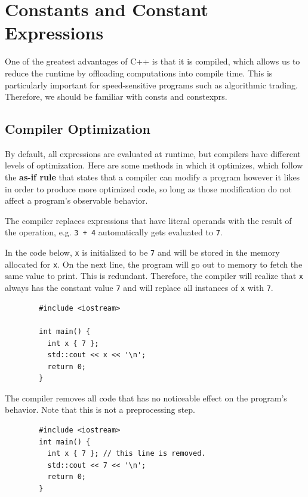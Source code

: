 \documentclass{article}
\newcounter{definition}[section]
\newcounter{algo}[section]
\newcounter{code}[section]
\begin{document}
\section{Constants and Constant Expressions}

    One of the greatest advantages of C++ is that it is compiled, which allows us to reduce the runtime by offloading computations into compile time. This is particularly important for speed-sensitive programs such as algorithmic trading. Therefore, we should be familiar with consts and constexprs. 

  \subsection{Compiler Optimization} 

    By default, all expressions are evaluated at runtime, but compilers have different levels of optimization. Here are some methods in which it optimizes, which follow the \textbf{as-if rule} that states that a compiler can modify a program however it likes in order to produce more optimized code, so long as those modification do not affect a program's observable behavior. 

    \begin{definition}
      \label{def:constant-folding}
 
      The compiler replaces expressions that have literal operands with the result of the operation, e.g. \texttt{3 + 4} automatically gets evaluated to \texttt{7}. 
    \end{definition}

    \begin{definition}
      \label{def:constant-propagation}
      In the code below, \texttt{x} is initialized to be \texttt{7} and will be stored in the memory allocated for \texttt{x}. On the next line, the program will go out to memory to fetch the same value to print. This is redundant. Therefore, the compiler will realize that \texttt{x} always has the constant value \texttt{7} and will replace all instances of \texttt{x} with \texttt{7}. 
      \begin{lstlisting}
        #include <iostream>

        int main() {
          int x { 7 };
          std::cout << x << '\n';
          return 0;
        } 
      \end{lstlisting}
    \end{definition}

    \begin{definition}
      \label{def:dead-code-elimination}
      The compiler removes all code that has no noticeable effect on the program's behavior. Note that this is not a preprocessing step. 
      \begin{lstlisting}
        #include <iostream>
        int main() {
          int x { 7 }; // this line is removed. 
          std::cout << 7 << '\n';
          return 0;
        } 
      \end{lstlisting}
    \end{definition} 
\end{document}
